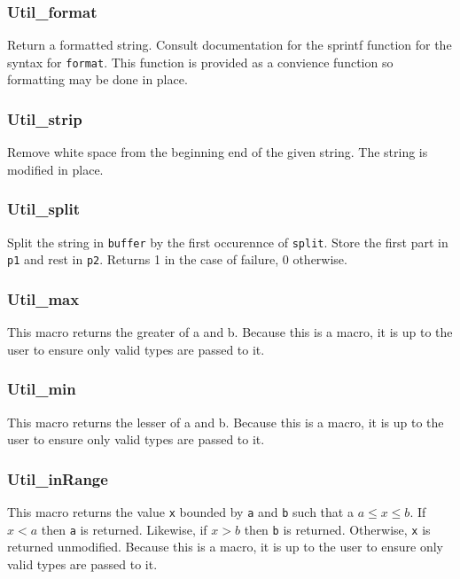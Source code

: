 \subsubsection{Util\_format} \label{apiutilformat}
 Return a formatted string. Consult
documentation for the sprintf function for the syntax for \texttt{format}. This
function is provided as a convience function so formatting may be done in place.

\subsubsection{Util\_strip} \label{apiutilstrip}
 Remove white space from the beginning end
of the given string. The string is modified in place.

\subsubsection{Util\_split} \label{apiutilsplit}
 Split
the string in \texttt{buffer} by the first occurennce of \texttt{split}. Store
the first part in \texttt{p1} and rest in \texttt{p2}. Returns 1 in the case of
failure, 0 otherwise.

\subsubsection{Util\_max} \label{apiutilmax}
 This macro returns the greater of a and b. Because
this is a macro, it is up to the user to ensure only valid types are passed to
it.

\subsubsection{Util\_min} \label{apiutilmin}
 This macro returns the lesser of a and b. Because
this is a macro, it is up to the user to ensure only valid types are passed to
it.

\subsubsection{Util\_inRange} \label{apiutilrange}
 This macro returns the value \texttt{x}
bounded by \texttt{a} and \texttt{b} such that a $a \leq x \leq b$. If $x < a$
then \texttt{a} is returned. Likewise, if $x > b$ then \texttt{b} is
returned. Otherwise, \texttt{x} is returned unmodified. Because this is a macro,
it is up to the user to ensure only valid types are passed to it.

